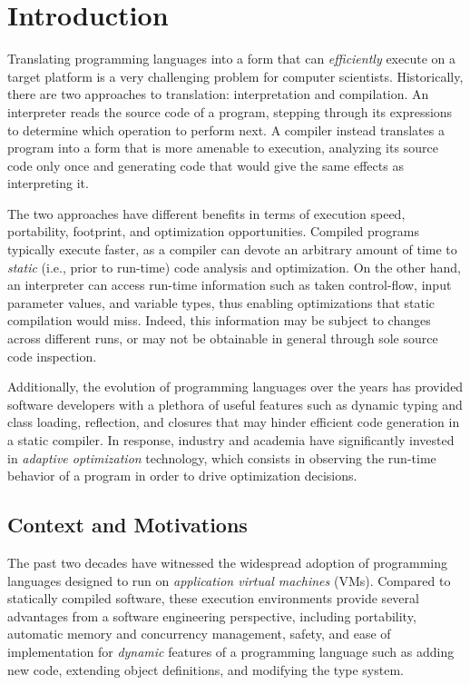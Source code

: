 \chapter{Introduction}

Translating programming languages into a form that can {\em efficiently} execute on a target platform is a very challenging problem for computer scientists. Historically, there are two approaches to translation: interpretation and compilation. An interpreter reads the source code of a program, stepping through its expressions to determine which operation to perform next. A compiler instead translates a program into a form that is more amenable to execution, analyzing its source code only once and generating code that would give the same effects as interpreting it.

The two approaches have different benefits in terms of execution speed, portability, footprint, and optimization opportunities. Compiled programs typically execute faster, as a compiler can devote an arbitrary amount of time to {\em static} (i.e., prior to run-time) code analysis and optimization. On the other hand, an interpreter can access run-time information such as taken control-flow, input parameter values, and variable types, thus enabling optimizations that static compilation would miss. Indeed, this information may be subject to changes across different runs, or may not be obtainable in general through sole source code inspection.

Additionally, the evolution of programming languages over the years has provided software developers with a plethora of useful features such as dynamic typing and class loading, reflection, and closures that may hinder efficient code generation in a static compiler. In response, industry and academia have significantly invested in {\em adaptive optimization} technology, which consists in observing the run-time behavior of a program in order to drive optimization decisions.

\section{Context and Motivations}

The past two decades have witnessed the widespread adoption of programming languages designed to run on {\em application virtual machines} (VMs). Compared to statically compiled software, these execution environments provide several advantages from a software engineering perspective, including portability, automatic memory and concurrency management, safety, and ease of implementation for {\em dynamic} features of a programming language such as adding new code, extending object definitions, and modifying the type system.

